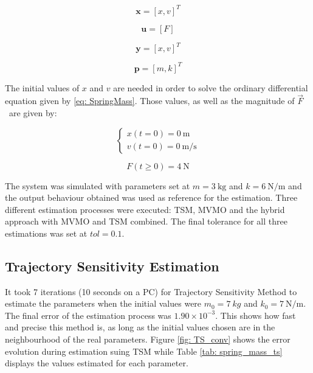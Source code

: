 \begin{equation}
	\mathbf{x} = [x, v]^{T}
	\label{eq: spring_mass_x}
\end{equation}

\begin{equation}
	\mathbf{u} = [F]
	\label{eq: spring_mass_u}
\end{equation}

\begin{equation}
	\mathbf{y} = [x,v]^{T}
	\label{eq: spring_mass_y}
\end{equation}

\begin{equation}
	\mathbf{p} = [m, k]^{T}
	\label{eq: spring_mass_p}
\end{equation}

The initial values of $x$ and $v$ are needed in order to solve the ordinary differential equation given by \eqref{eq: SpringMass}. Those values, as well as the magnitude of $\vec{F}$\ are given by:

\begin{equation}
	\begin{cases}
		x(t=0) = 0\ \text{m}\\
		v(t=0) = 0\ \text{m/s}
	\end{cases}
\end{equation}

\begin{equation}
	F(t\geq 0) = 4\ \text{N}
\end{equation}

The system was simulated with parameters set at $m = 3\ \text{kg}$ and $k = 6\ \text{N/m}$ and the output behaviour obtained was used as reference for the estimation. Three different estimation processes were executed: TSM, MVMO and the hybrid approach with MVMO and TSM combined. The final tolerance for all three estimations was set at $tol = 0.1$.

\subsection{Trajectory Sensitivity Estimation}

It took 7 iterations (10 seconds on a PC) for Trajectory Sensitivity Method to estimate the parameters when the initial values were $m_{0} = 7\ kg$ and $k_{0} = 7\ \text{N/m}$. The final error of the estimation process was $1.90\times 10^{-3}$. This shows how fast and precise this method is, as long as the initial values chosen are in the neighbourhood of the real parameters. Figure \ref{fig: TS_conv} shows the error evolution during estimation suing TSM while Table \ref{tab: spring_mass_ts} displays the values estimated for each parameter.

